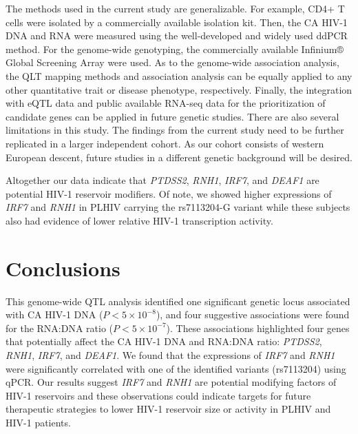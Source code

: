 \documentclass{book}
\begin{document}
\begin{refsection}
The methods used in the current study are generalizable.
For example, CD4+ T cells were isolated by a commercially available isolation kit.
Then, the CA HIV-1 DNA and RNA were measured using the well-developed and widely used ddPCR method.
For the genome-wide genotyping, the commercially available Infinium® Global Screening Array were used.
As to the genome-wide association analysis, the QLT mapping methods and association analysis can be equally applied to any other quantitative trait or disease phenotype, respectively.
Finally, the integration with eQTL data and public available RNA-seq data for the prioritization of candidate genes can be applied in future genetic studies.
There are also several limitations in this study.
The findings from the current study need to be further replicated in a larger independent cohort.
As our cohort consists of western European descent, future studies in a different genetic background will be desired.

Altogether our data indicate that \textit{PTDSS2}, \textit{RNH1}, \textit{IRF7}, and \textit{DEAF1} are potential HIV-1 reservoir modifiers.
Of note, we showed higher expressions of \textit{IRF7} and \textit{RNH1} in PLHIV carrying the rs7113204-G variant while these subjects also had evidence of lower relative HIV-1 transcription activity.

\section*{Conclusions}
This genome-wide QTL analysis identified one significant genetic locus associated with CA HIV-1 DNA ($P < 5 \times 10^{-8}$), and four suggestive associations were found for the RNA:DNA ratio ($P < 5 \times 10^{-7}$).
These associations highlighted four genes that potentially affect the CA HIV-1 DNA and RNA:DNA ratio: \textit{PTDSS2}, \textit{RNH1}, \textit{IRF7}, and \textit{DEAF1}.
We found that the expressions of \textit{IRF7} and \textit{RNH1} were significantly correlated with one of the identified variants (rs7113204) using qPCR.
Our results suggest \textit{IRF7} and \textit{RNH1} are potential modifying factors of HIV-1 reservoirs and these observations could indicate targets for future therapeutic strategies to lower HIV-1 reservoir size or activity in PLHIV and HIV-1 patients.


\end{refsection}
\end{document}
